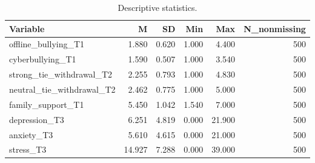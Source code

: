 \begin{table}
\caption{Descriptive statistics.}
\label{tab:desc}
\begin{tabular}{lrrrrr}
\toprule
Variable & M & SD & Min & Max & N_nonmissing \\
\midrule
offline_bullying_T1 & 1.880 & 0.620 & 1.000 & 4.400 & 500 \\
cyberbullying_T1 & 1.590 & 0.507 & 1.000 & 3.540 & 500 \\
strong_tie_withdrawal_T2 & 2.255 & 0.793 & 1.000 & 4.830 & 500 \\
neutral_tie_withdrawal_T2 & 2.462 & 0.775 & 1.000 & 5.000 & 500 \\
family_support_T1 & 5.450 & 1.042 & 1.540 & 7.000 & 500 \\
depression_T3 & 6.251 & 4.819 & 0.000 & 21.900 & 500 \\
anxiety_T3 & 5.610 & 4.615 & 0.000 & 21.000 & 500 \\
stress_T3 & 14.927 & 7.288 & 0.000 & 39.000 & 500 \\
\bottomrule
\end{tabular}
\end{table}
